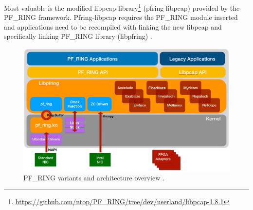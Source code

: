 \documentclass[12pt,a4paper,twoside]{book}
\begin{document}
            Most valuable is the modified libpcap library\footnote{\url{https://github.com/ntop/PF_RING/tree/dev/userland/libpcap-1.8.1}} (pfring-libpcap) provided by the PF\_RING framework. Pfring-libpcap requires the PF\_RING module inserted and applications need to be recompiled with linking the new libpcap and specifically linking PF\_RING library (libpfring) \cite{docs:pfring:libpcap}. 
            \begin{figure}[h]
                \centering
                \includegraphics[scale=0.35]{overall_pf_ring}
                \caption{PF\_RING variants and architecture overview \cite{image:ntop}.}
                \label{figure:pfring:overview}
            \end{figure}
\end{document}
